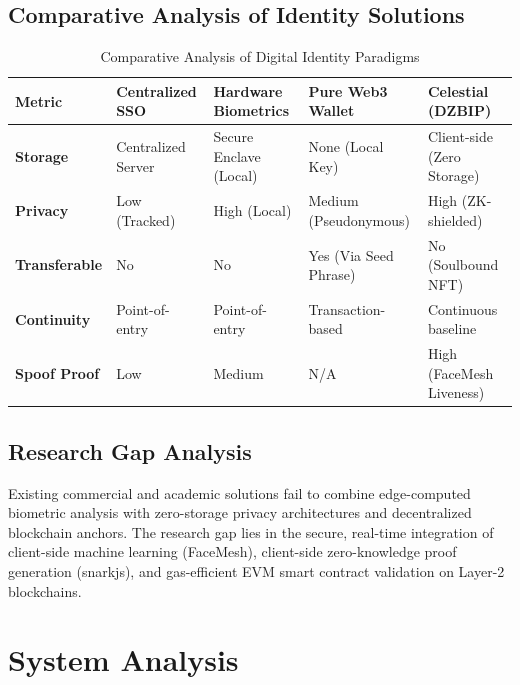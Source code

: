 \documentclass[12pt,a4paper,oneside]{report}
\begin{document}
\section{Comparative Analysis of Identity Solutions}
\begin{table}[H]
    \centering
    \caption{Comparative Analysis of Digital Identity Paradigms}
    \label{tab:comparative_identity}
    \begin{tabular}{lllll}
        \toprule
        \textbf{Metric} & \textbf{Centralized SSO} & \textbf{Hardware Biometrics} & \textbf{Pure Web3 Wallet} & \textbf{Celestial (DZBIP)} \\
        \midrule
        \textbf{Storage} & Centralized Server & Secure Enclave (Local) & None (Local Key) & Client-side (Zero Storage) \\
        \textbf{Privacy} & Low (Tracked) & High (Local) & Medium (Pseudonymous) & High (ZK-shielded) \\
        \textbf{Transferable} & No & No & Yes (Via Seed Phrase) & No (Soulbound NFT) \\
        \textbf{Continuity} & Point-of-entry & Point-of-entry & Transaction-based & Continuous baseline \\
        \textbf{Spoof Proof} & Low & Medium & N/A & High (FaceMesh Liveness) \\
        \bottomrule
    \end{tabular}
\end{table}

\section{Research Gap Analysis}
Existing commercial and academic solutions fail to combine edge-computed biometric analysis with zero-storage privacy architectures and decentralized blockchain anchors. The research gap lies in the secure, real-time integration of client-side machine learning (FaceMesh), client-side zero-knowledge proof generation (snarkjs), and gas-efficient EVM smart contract validation on Layer-2 blockchains.

\newpage

\chapter{System Analysis}
\end{document}
